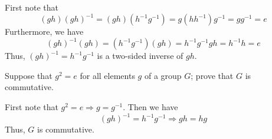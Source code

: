 \documentclass[../master.tex]{subfiles}
\begin{document}
  \begin{solution}
      First note that
      \[
          (gh) (gh)^{-1} = (gh) (h^{-1} g^{-1}) = g (h h^{-1}) g^{-1} = g g^{-1}
          = e
      \] 
      Furthermore, we have
      \[
          (gh)^{-1} (gh) = (h^{-1} g^{-1}) (gh) = h^{-1} g^{-1} g h = h^{-1} h =
          e
      \] 
      Thus, $(gh)^{-1} = h^{-1} g^{-1}$ is a two-sided inverse of $gh$.
  \end{solution}

  \begin{problem}
      Suppose that $g^2 = e$ for all elements $g$ of a group $G$; prove that $G$ 
      is commutative.
  \end{problem}

  \begin{solution}
      First note that $g^2 = e \Longrightarrow g = g^{-1}$. Then we have
      \[
          (gh)^{-1} = h^{-1} g^{-1} \Longrightarrow gh = hg
      \] 
      Thus, $G$ is commutative.
  \end{solution}
\end{document}
